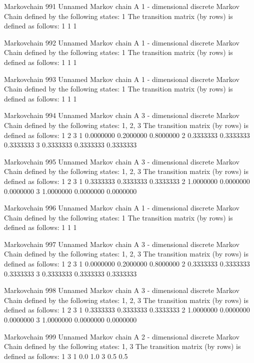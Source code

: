 \documentclass[
  nojss]{jss}
\begin{document}
\begin{CodeChunk}
\begin{CodeOutput}
Markovchain  991 
Unnamed Markov chain 
 A  1 - dimensional discrete Markov Chain defined by the following states: 
 1 
 The transition matrix  (by rows)  is defined as follows: 
  1
1 1

Markovchain  992 
Unnamed Markov chain 
 A  1 - dimensional discrete Markov Chain defined by the following states: 
 1 
 The transition matrix  (by rows)  is defined as follows: 
  1
1 1

Markovchain  993 
Unnamed Markov chain 
 A  1 - dimensional discrete Markov Chain defined by the following states: 
 1 
 The transition matrix  (by rows)  is defined as follows: 
  1
1 1

Markovchain  994 
Unnamed Markov chain 
 A  3 - dimensional discrete Markov Chain defined by the following states: 
 1, 2, 3 
 The transition matrix  (by rows)  is defined as follows: 
          1         2         3
1 0.0000000 0.2000000 0.8000000
2 0.3333333 0.3333333 0.3333333
3 0.3333333 0.3333333 0.3333333

Markovchain  995 
Unnamed Markov chain 
 A  3 - dimensional discrete Markov Chain defined by the following states: 
 1, 2, 3 
 The transition matrix  (by rows)  is defined as follows: 
          1         2         3
1 0.3333333 0.3333333 0.3333333
2 1.0000000 0.0000000 0.0000000
3 1.0000000 0.0000000 0.0000000

Markovchain  996 
Unnamed Markov chain 
 A  1 - dimensional discrete Markov Chain defined by the following states: 
 1 
 The transition matrix  (by rows)  is defined as follows: 
  1
1 1

Markovchain  997 
Unnamed Markov chain 
 A  3 - dimensional discrete Markov Chain defined by the following states: 
 1, 2, 3 
 The transition matrix  (by rows)  is defined as follows: 
          1         2         3
1 0.0000000 0.2000000 0.8000000
2 0.3333333 0.3333333 0.3333333
3 0.3333333 0.3333333 0.3333333

Markovchain  998 
Unnamed Markov chain 
 A  3 - dimensional discrete Markov Chain defined by the following states: 
 1, 2, 3 
 The transition matrix  (by rows)  is defined as follows: 
          1         2         3
1 0.3333333 0.3333333 0.3333333
2 1.0000000 0.0000000 0.0000000
3 1.0000000 0.0000000 0.0000000

Markovchain  999 
Unnamed Markov chain 
 A  2 - dimensional discrete Markov Chain defined by the following states: 
 1, 3 
 The transition matrix  (by rows)  is defined as follows: 
    1   3
1 0.0 1.0
3 0.5 0.5
\end{CodeOutput}
\end{CodeChunk}
\end{document}
